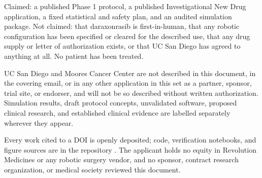 \vspace{-0.2em}

Claimed: a published Phase 1 protocol, a published Investigational New Drug
application, a fixed statistical and safety plan, and an audited simulation
package. Not claimed: that daraxonrasib is first-in-human, that any robotic
configuration has been specified or cleared for the described use, that any
drug supply or letter of authorization exists, or that UC San Diego has agreed
to anything at all. No patient has been treated.

UC San Diego and Moores Cancer Center are not described in this document, in the
covering email, or in any other application in this set as a partner, sponsor,
trial site, or endorser, and will not be so described without written
authorization. Simulation results, draft protocol concepts, unvalidated
software, proposed clinical research, and established clinical evidence are
labelled separately wherever they appear.

\vspace{-0.2em}

Every work cited to a DOI is openly deposited; code, verification notebooks, and
figure sources are in the repository \cite{repo2026}. The applicant holds no
equity in Revolution Medicines or any robotic surgery vendor, and no sponsor,
contract research organization, or medical society reviewed this document.

\vspace{0.1em}
\apprule{0.4pt}
\vspace{-0.1em}

\vspace{-0.35em}
\begin{apprefs}


\end{apprefs}
